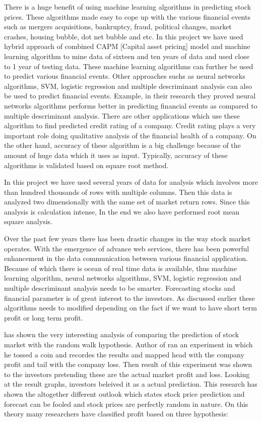 \indent
There is a huge benefit of using machine learning algorithms in predicting stock prices. These algorithms made easy to cope up with the various financial events
such as mergers acquisitions, bankruptcy, fraud, political changes, market crashes, housing bubble, dot net bubble and etc. 
In this project we have used hybrid approach of combined CAPM [Capital asset pricing] model and machine learning algorithm to mine data of sixteen
and ten years of data and used close to 1 year of testing data. These machine learning algorithms can further be used to predict various financial events. 
Other approaches suchs as neural networks algorithms, SVM, logistic regression and multiple descriminant analysis can also be used to predict financial events. 
Example, \cite{Ref12} in their research they proved neural networks algorithms performs better in predicting financial events as compared to multiple descriminant 
analysis. There are other applications which use these algorithm to find predicted credit rating of a company. Credit rating plays a very important role 
doing qualitative analysis of the financial health of a company. On the other hand, accuracy of these algorithm is a big challenge because of the amount of huge data 
which it uses as input. Typically, accuracy of these algorithms is validated based on square root method. 

\indent
In this project we have used several years of data for analysis which involves more than hundred thousands of rows with multiple columns. Then this data is 
analyzed two dimensionally with the same set of market return rows. Since this analysis is calculation intense, In the end we also have performed root mean
square analysis. 

\indent
Over the past few years there has been drastic changes in the way stock market operates. With the emergence of advance web services, there has been powerful 
enhancement in the data communication between various financial application. Because of which there is ocean of real time data is available, thus machine learning 
algorithm, neural networks algorithms, SVM, logistic regression and multiple descriminant analysis needs to be smarter. Forecasting stocks and financial parameter 
is of great interest to the investors. As discussed earlier these algorithms needs to modified depending on the fact if we want to have short term profit or long 
term profit. 

\indent 
\cite{Ref13} has shown the very interesting analysis of comparing the prediction of stock market with the random walk hypothesis. Author of \cite{Ref13} ran an 
experiment in which he tossed a coin and recordes the results and mapped head with the company profit and tail with the company loss. Then result of this experiment 
was shown to the investors pretending these are the actual market profit and loss. Looking at the result graphs, investors beleived it as a actual prediction. 
This research has shown the altogether different outlook which states stock price prediction and forecast can be fooled and stock prices are perfectly random in
nature. On this theory many researchers have classified profit based on three hypothesis:

